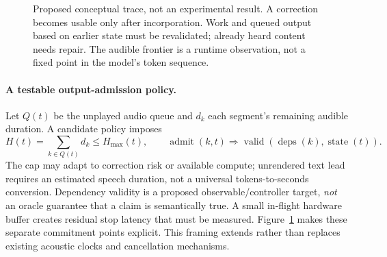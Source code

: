 \documentclass{article}
\begin{document}
\begin{figure}[htbp]
\centering
{}
\caption{Proposed conceptual trace, not an experimental result. A correction becomes usable only after incorporation. Work and queued output based on earlier state must be revalidated; already heard content needs repair. The audible frontier is a runtime observation, not a fixed point in the model's token sequence.}
\label{fig:clocks}
\end{figure}

\paragraph{A testable output-admission policy.}
Let $Q(t)$ be the unplayed audio queue and $d_k$ each segment's remaining audible duration. A candidate policy imposes
\begin{equation}
\label{eq:admission}
H(t)=\sum_{k\in Q(t)} d_k\leq H_{\max}(t),\qquad
\operatorname{admit}(k,t)\Rightarrow\operatorname{valid}(\operatorname{deps}(k),\operatorname{state}(t)).
\end{equation}
The cap may adapt to correction risk or available compute; unrendered text lead requires an estimated speech duration, not a universal tokens-to-seconds conversion. Dependency validity is a proposed observable/controller target, \emph{not} an oracle guarantee that a claim is semantically true. A small in-flight hardware buffer creates residual stop latency that must be measured. Figure~\ref{fig:clocks} makes these separate commitment points explicit. This framing extends rather than replaces existing acoustic clocks and cancellation mechanisms.
\end{document}
